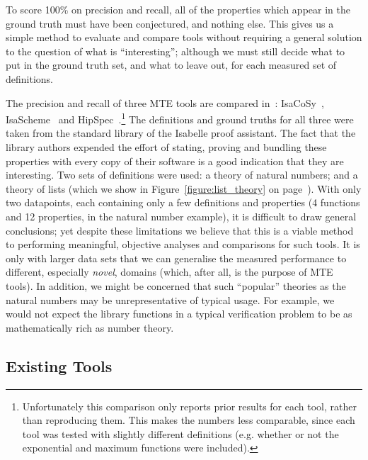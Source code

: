 To score 100\% on precision and recall, all of the properties which appear in
the ground truth must have been conjectured, and nothing else. This gives us a
simple method to evaluate and compare tools without requiring a general solution
to the question of what is ``interesting''; although we must still decide what
to put in the ground truth set, and what to leave out, for each measured set of
definitions.

\begin{sloppypar}
  The precision and recall of three MTE tools are compared
  in~\cite{claessen2013automating}:
  IsaCoSy~\cite{Johansson.Dixon.Bundy:conjecture-generation},
  IsaScheme~\cite{Montano-Rivas.McCasland.Dixon.ea:2012} and
  HipSpec~\cite{Claessen_hipspec:automating}.\footnote{Unfortunately this
    comparison only reports prior results for each tool, rather than reproducing
    them. This makes the numbers less comparable, since each tool was tested
    with slightly different definitions (e.g. whether or not the exponential and
    maximum functions were included).} The definitions and ground truths for all
  three were taken from the standard library of the Isabelle proof assistant.
  The fact that the library authors expended the effort of stating, proving and
  bundling these properties with every copy of their software is a good
  indication that they are interesting. Two sets of definitions were used: a
  theory of natural numbers; and a theory of lists (which we show in
  Figure~\ref{figure:list_theory} on page~\pageref{figure:list_theory}). With
  only two datapoints, each containing only a few definitions and properties (4
  functions and 12 properties, in the natural number example), it is difficult
  to draw general conclusions; yet despite these limitations we believe that
  this is a viable method to performing meaningful, objective analyses and
  comparisons for such tools. It is only with larger data sets that we can
  generalise the measured performance to different, especially \emph{novel},
  domains (which, after all, is the purpose of MTE tools). In addition, we might
  be concerned that such ``popular'' theories as the natural numbers may be
  unrepresentative of typical usage. For example, we would not expect the
  library functions in a typical verification problem to be as mathematically
  rich as number theory.
\end{sloppypar}

\subsection{Existing Tools}
\label{sec:existing-tools}

